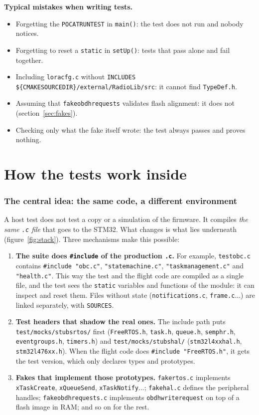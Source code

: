 \documentclass[11pt,a4paper]{article}
\DeclareRobustCommand{\_}{\textunderscore\allowbreak}
\newcommand{\cd}[1]{\texttt{#1}}
\begin{document}
\textbf{Typical mistakes when writing tests.}
\begin{itemize}
\item Forgetting the \cd{POCAT\_RUN\_TEST} in \cd{main()}: the test does not run and nobody notices.
\item Forgetting to reset a \cd{static} in \cd{setUp()}: tests that pass alone and fail together.
\item Including \cd{lora\_cfg.c} without \cd{INCLUDES \$\{CMAKE\_SOURCE\_DIR\}/external/RadioLib/src}: it cannot find \cd{TypeDef.h}.
\item Assuming that \cd{fake\_obdh\_requests} validates flash alignment: it does not (section~\ref{sec:fakes}).
\item Checking only what the fake itself wrote: the test always passes and proves nothing.
\end{itemize}
\part{How the tests work inside}

\section{The central idea: the same code, a different environment}\label{sec:idea}

A host test does not test a copy or a simulation of the firmware. It compiles \emph{the same
\cd{.c} file} that goes to the STM32. What changes is what lies underneath
(figure~\ref{fig:stack}). Three mechanisms make this possible:

\begin{enumerate}
\item \textbf{The suite does \cd{\#include} of the production \cd{.c}.} For example,
  \cd{test\_obc.c} contains \cd{\#include "obc.c"}, \cd{"state\_machine.c"},
  \cd{"task\_management.c"} and \cd{"health.c"}. This way the test and the flight code
  are compiled as a single file, and the test sees the \cd{static} variables and functions of
  the module: it can inspect and reset them. Files without state (\cd{notifications.c},
  \cd{frame.c}...) are linked separately, with \cd{SOURCES}.
\item \textbf{Test headers that shadow the real ones.} The include path puts
  \cd{test/mocks/stubs\_rtos/} first (\cd{FreeRTOS.h}, \cd{task.h}, \cd{queue.h}, \cd{semphr.h},
  \cd{event\_groups.h}, \cd{timers.h}) and \cd{test/mocks/stubs\_hal/} (\cd{stm32l4xx\_hal.h},
  \cd{stm32l476xx.h}). When the flight code does \cd{\#include "FreeRTOS.h"}, it gets the test
  version, which only declares types and prototypes.
\item \textbf{Fakes that implement those prototypes.} \cd{fake\_rtos.c} implements
  \cd{xTaskCreate}, \cd{xQueueSend}, \cd{xTaskNotify}...; \cd{fake\_hal.c} defines the
  peripheral handles; \cd{fake\_obdh\_requests.c} implements \cd{obdh\_write\_request}
  on top of a flash image in RAM; and so on for the rest.
\end{enumerate}
\end{document}
